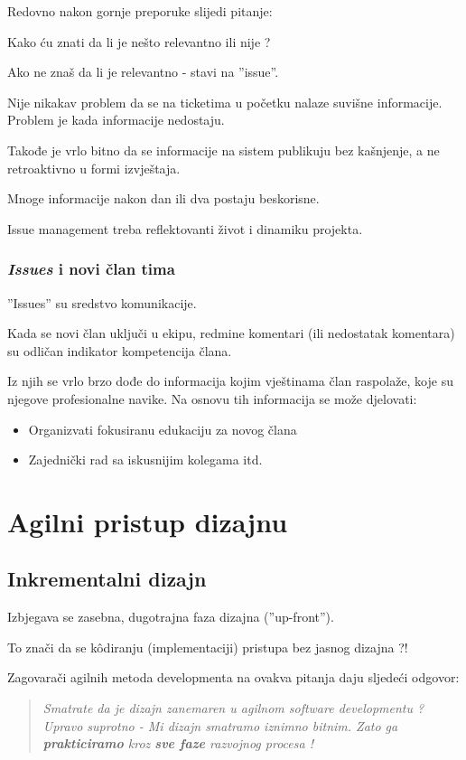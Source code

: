\documentclass[lmodern, utf8, zavrsni]{fit}
\begin{document}
Redovno nakon gornje preporuke slijedi pitanje:

Kako ću znati da li je nešto relevantno  ili nije ?

Ako ne znaš da li je relevantno - stavi na ''issue''. 

Nije nikakav problem da se na ticketima u početku nalaze suvišne informacije. Problem je kada informacije nedostaju.

Takođe je vrlo bitno da se informacije na sistem publikuju bez kašnjenje, a ne retroaktivno u formi izvještaja.

Mnoge informacije nakon dan ili dva postaju beskorisne.

Issue management treba reflektovanti život i dinamiku projekta.

\subsection{\emph{Issues} i novi član tima}

''Issues'' su sredstvo komunikacije.

Kada se novi član uključi u ekipu, redmine komentari (ili nedostatak komentara) su odličan indikator kompetencija člana.

Iz njih se vrlo brzo dođe do informacija kojim vještinama član raspolaže, koje su njegove profesionalne navike. Na osnovu tih informacija se može djelovati: 
\begin{itemize}
  \item Organizvati fokusiranu edukaciju za novog člana
  \item Zajednički rad sa iskusnijim kolegama itd.
\end{itemize}

\chapter{Agilni pristup dizajnu}

\section{Inkrementalni dizajn}

Izbjegava se zasebna, dugotrajna faza dizajna (''up-front''). 

To znači da se k\^odiranju (implementaciji) pristupa bez jasnog dizajna ?!

Zagovarači agilnih metoda developmenta na ovakva pitanja daju sljedeći odgovor:

\begin{quote}
   \emph{\large Smatrate da je dizajn zanemaren u agilnom software developmentu ? Upravo suprotno - Mi dizajn smatramo iznimno bitnim. Zato ga \textbf{prakticiramo} kroz \textbf{sve faze} razvojnog procesa !} 
\end{quote}
\end{document}
